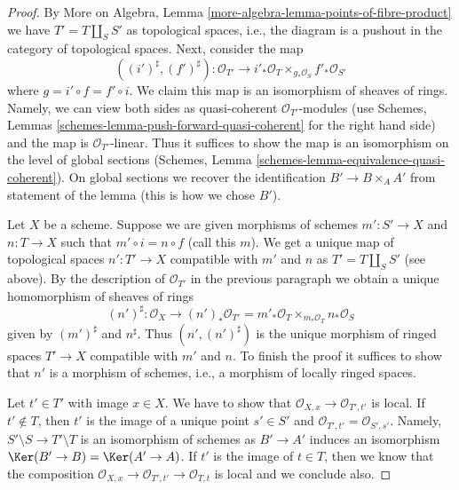 \begin{proof}
By More on Algebra, Lemma \ref{more-algebra-lemma-points-of-fibre-product}
we have $T' = T \amalg_S S'$ as topological spaces, i.e., the diagram
is a pushout in the category of topological spaces. Next, consider
the map
$$
((i')^\sharp, (f')^\sharp) :
\mathcal{O}_{T'}
\longrightarrow
i'_*\mathcal{O}_T \times_{g_*\mathcal{O}_S} f'_*\mathcal{O}_{S'}
$$
where $g = i' \circ f = f' \circ i$. We claim this map is an isomorphism of
sheaves of rings. Namely, we can view both sides as quasi-coherent
$\mathcal{O}_{T'}$-modules (use
Schemes, Lemmas \ref{schemes-lemma-push-forward-quasi-coherent}
for the right hand side) and the map is $\mathcal{O}_{T'}$-linear.
Thus it suffices to show the map is an isomorphism on the level
of global sections
(Schemes, Lemma \ref{schemes-lemma-equivalence-quasi-coherent}).
On global sections we recover the identification
$B' \to B \times_A A'$ from statement of the lemma (this is
how we chose $B'$).

\medskip\noindent
Let $X$ be a scheme. Suppose we are given morphisms of schemes
$m' : S' \to X$ and $n : T \to X$ such that $m' \circ i = n \circ f$
(call this $m$). We get a unique map of topological spaces
$n' : T' \to X$ compatible with $m'$ and $n$ as
$T' = T \amalg_S S'$ (see above).
By the description of $\mathcal{O}_{T'}$ in the previous
paragraph we obtain a unique homomorphism of sheaves of rings
$$
(n')^\sharp :
\mathcal{O}_X
\longrightarrow
(n')_*\mathcal{O}_{T'} =
m'_*\mathcal{O}_T \times_{m_*\mathcal{O}_T} n_*\mathcal{O}_S
$$
given by $(m')^\sharp$ and $n^\sharp$.
Thus $(n', (n')^\sharp)$ is the unique morphism of
ringed spaces $T' \to X$ compatible with $m'$ and $n$.
To finish the proof it suffices to show that $n'$
is a morphism of schemes, i.e., a morphism of locally ringed spaces.

\medskip\noindent
Let $t' \in T'$ with image $x \in X$.
We have to show that $\mathcal{O}_{X, x} \to \mathcal{O}_{T', t'}$
is local. If $t' \not \in T$, then $t'$ is the image of a unique
point $s' \in S'$ and $\mathcal{O}_{T', t'} = \mathcal{O}_{S', s'}$.
Namely, $S' \setminus S \to T' \setminus T$ is an isomorphism of
schemes as $B' \to A'$ induces an isomorphism
$\Ker(B' \to B) = \Ker(A' \to A)$.
If $t'$ is the image of $t \in T$, then
we know that the composition
$\mathcal{O}_{X, x} \to \mathcal{O}_{T', t'} \to \mathcal{O}_{T, t}$
is local and we conclude also.
\end{proof}

